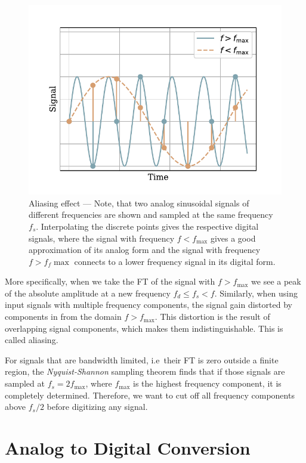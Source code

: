 \begin{figure}[!htb]
  \centering
  \includegraphics[scale=0.72]{figures/electronics/aaf/plot_aliasing}
  \caption[Aliasing]{Aliasing effect --- Note, that two analog sinusoidal signals of different frequencies are shown and sampled at the same frequency $f_s$. Interpolating the discrete points gives the respective digital signals, where the signal with frequency $f<f_{\max}$ gives a good approximation of its analog form and the signal with frequency $f>f_f{\max}$ connects to a lower frequency signal in its digital form.%
    \label{fig:plot_aliasing}}
\end{figure}

More specifically, when we take the \acf{FT} of the signal with $f>f_{\max}$ we see a peak of the absolute amplitude at a new frequency $f_d\leq f_s<f$. Similarly, when using input signals with multiple frequency components, the signal gain distorted by components in from the domain $f>f_{\max}$. This distortion is the result of overlapping signal components, which makes them indistinguishable. This is called aliasing.

For signals that are bandwidth limited, i.e\ their \ac{FT} is zero outside a finite region, the \emph{Nyquist-Shannon} sampling theorem finds that if those signals are sampled at $f_s=2f_{\max}$, where $f_{\max}$ is the highest frequency component, it is completely determined. Therefore, we want to cut off all frequency components above $f_s/2$ before digitizing any signal.

\section{Analog to Digital Conversion}

